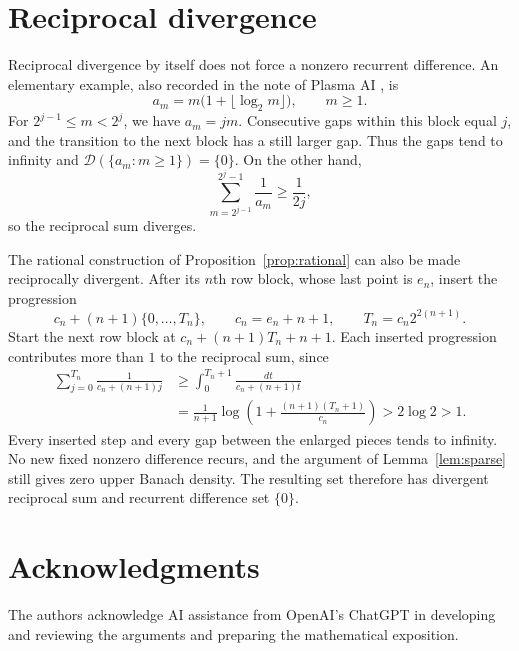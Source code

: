 \documentclass[11pt,leqno]{amsart}
\numberwithin{equation}{section}
\theoremstyle{definition}
\theoremstyle{remark}
\newcommand{\D}{\mathcal D}
\begin{document}
\section{Reciprocal divergence}

Reciprocal divergence by itself does not force a nonzero recurrent difference. An elementary example, also recorded in the note of Plasma AI \cite{Plasma}, is
\begin{equation}\label{eq:harmonic}
a_m=m\bigl(1+\lfloor\log_2m\rfloor\bigr),\qquad m\ge1.
\end{equation}
For $2^{j-1}\le m<2^j$, we have $a_m=jm$. Consecutive gaps within this block equal $j$, and the transition to the next block has a still larger gap. Thus the gaps tend to infinity and $\D(\{a_m:m\ge1\})=\{0\}$. On the other hand,
\[
\sum_{m=2^{j-1}}^{2^j-1}\frac1{a_m}\ge\frac1{2j},
\]
so the reciprocal sum diverges.

The rational construction of Proposition~\ref{prop:rational} can also be made reciprocally divergent. After its $n$th row block, whose last point is $e_n$, insert the progression
\[
c_n+(n+1)\{0,\ldots,T_n\},\qquad
c_n=e_n+n+1,\qquad T_n=c_n2^{2(n+1)}.
\]
Start the next row block at $c_n+(n+1)T_n+n+1$. Each inserted progression contributes more than $1$ to the reciprocal sum, since
\begin{align*}
\sum_{j=0}^{T_n}\frac1{c_n+(n+1)j}
&\ge\int_0^{T_n+1}\frac{dt}{c_n+(n+1)t}\\
&=\frac1{n+1}\log\left(1+\frac{(n+1)(T_n+1)}{c_n}\right)
>2\log2>1.
\end{align*}
Every inserted step and every gap between the enlarged pieces tends to infinity. No new fixed nonzero difference recurs, and the argument of Lemma~\ref{lem:sparse} still gives zero upper Banach density. The resulting set therefore has divergent reciprocal sum and recurrent difference set $\{0\}$.

\section*{Acknowledgments}
The authors acknowledge AI assistance from OpenAI's ChatGPT in developing and reviewing the arguments and preparing the mathematical exposition.
\end{document}
